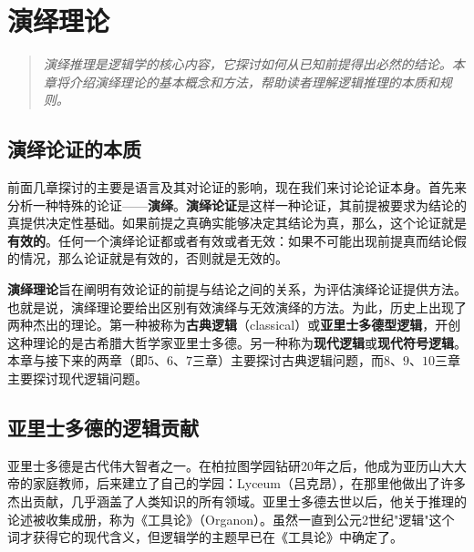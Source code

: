 \section{演绎理论}

\begin{quotation}
\textit{演绎推理是逻辑学的核心内容，它探讨如何从已知前提得出必然的结论。本章将介绍演绎理论的基本概念和方法，帮助读者理解逻辑推理的本质和规则。}
\end{quotation}

\subsection{演绎论证的本质}

前面几章探讨的主要是语言及其对论证的影响，现在我们来讨论论证本身。首先来分析一种特殊的论证——\textbf{演绎}。\textbf{演绎论证}是这样一种论证，其前提被要求为结论的真提供决定性基础。如果前提之真确实能够决定其结论为真，那么，这个论证就是\textbf{有效的}。任何一个演绎论证都或者有效或者无效：如果不可能出现前提真而结论假的情况，那么论证就是有效的，否则就是无效的。

\textbf{演绎理论}旨在阐明有效论证的前提与结论之间的关系，为评估演绎论证提供方法。也就是说，演绎理论要给出区别有效演绎与无效演绎的方法。为此，历史上出现了两种杰出的理论。第一种被称为\textbf{古典逻辑}（classical）或\textbf{亚里士多德型逻辑}，开创这种理论的是古希腊大哲学家亚里士多德。另一种称为\textbf{现代逻辑}或\textbf{现代符号逻辑}。本章与接下来的两章（即$5、6、7$三章）主要探讨古典逻辑问题，而$8、9、10$三章主要探讨现代逻辑问题。

\subsection{亚里士多德的逻辑贡献}

亚里士多德是古代伟大智者之一。在柏拉图学园钻研20年之后，他成为亚历山大大帝的家庭教师，后来建立了自己的学园：Lyceum（吕克昂），在那里他做出了许多杰出贡献，几乎涵盖了人类知识的所有领域。亚里士多德去世以后，他关于推理的论述被收集成册，称为《工具论》（Organon）。虽然一直到公元2世纪"逻辑"这个词才获得它的现代含义，但逻辑学的主题早已在《工具论》中确定了。 

\begin{center}
\end{center} 